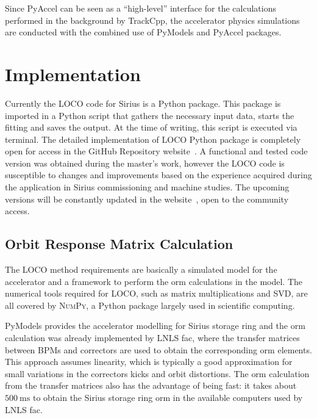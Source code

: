 Since PyAccel can be seen as a ``high-level'' interface for the calculations performed in the background by TrackCpp, the accelerator physics simulations are conducted with the combined use of PyModels and PyAccel packages.
\section{Implementation}
Currently the LOCO code for Sirius is a Python package. This package is imported in a Python script that gathers the necessary input data, starts the fitting and saves the output. At the time of writing, this script is executed via terminal. The detailed implementation of LOCO Python package is completely open for access in the GitHub Repository website~\cite{locosirius}. A functional and tested code version was obtained during the master's work, however the LOCO code is susceptible to changes and improvements based on the experience acquired during the application in Sirius commissioning and machine studies. The upcoming versions will be constantly updated in the website~\cite{locosirius}, open to the community access.

\subsection{Orbit Response Matrix Calculation}
The LOCO method requirements are basically a simulated model for the accelerator and a framework to perform the \gls{orm} calculations in the model. The numerical tools required for LOCO, such as matrix multiplications and SVD, are all covered by \textsc{NumPy}, a Python package largely used in scientific computing. 

PyModels provides the accelerator modelling for Sirius storage ring and the \gls{orm} calculation was already implemented by LNLS \gls{fac}, where the transfer matrices between BPMs and correctors are used to obtain the corresponding \gls{orm} elements. This approach assumes linearity, which is typically a good approximation for small variations in the correctors kicks and orbit distortions. The \gls{orm} calculation from the transfer matrices also has the advantage of being fast: it takes about $\SI{500}{\milli\second}$ to obtain the Sirius storage ring \gls{orm} in the available computers used by LNLS \gls{fac}.

